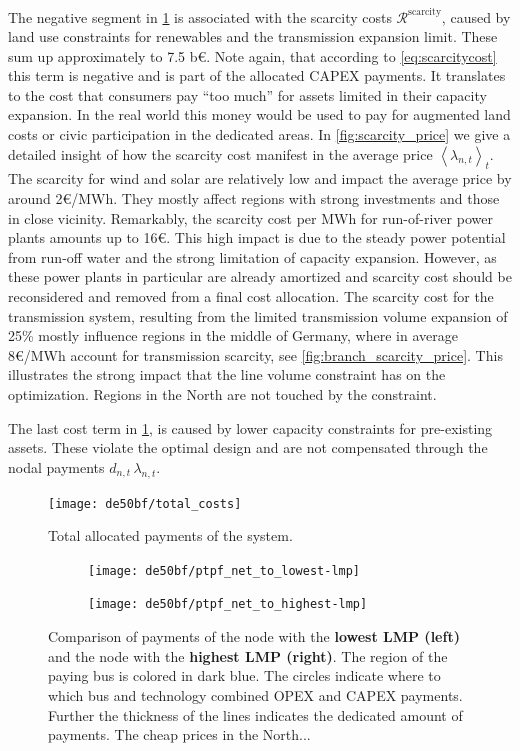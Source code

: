 \documentclass[11pt,twocolumn]{article}
\newcommand{\lmp}[1][n]{\lambda_{#1,t}}
\newcommand{\demand}[1][n]{d_{#1,t}}
\newcommand{\remainingcost}{\mathcal{R}}
\newcommand{\scarcitycost}{\remainingcost^\text{scarcity}}
\begin{document}
The negative segment in \cref{fig:total_cost} is associated with the scarcity costs $\scarcitycost$, caused by land use constraints for renewables and the transmission expansion limit. These sum up approximately to 7.5 b\euro. Note again, that according to \cref{eq:scarcitycost} this term is negative and is part of the allocated CAPEX payments. It translates to the cost that consumers pay ``too much'' for assets limited in their capacity expansion. In the real world this money would be used to pay for augmented land costs or civic participation in the dedicated areas. In \cref{fig:scarcity_price} we give a detailed insight of how the scarcity cost manifest in the average price $\left<\lmp\right>_t$. The scarcity for wind and solar are relatively low and impact the average price by around 2\euro/MWh. They mostly affect regions with strong investments and those in close vicinity. Remarkably, the scarcity cost per MWh for run-of-river power plants amounts up to 16\euro. This high impact is due to the steady power potential from run-off water and the strong limitation of capacity expansion. However, as these power plants in particular are already amortized and scarcity cost should be reconsidered and removed from a final cost allocation.    
The scarcity cost for the transmission system, resulting from the limited transmission volume expansion of 25\% mostly influence regions in the middle of Germany, where in average 8\euro/MWh account for transmission scarcity, see \cref{fig:branch_scarcity_price}. This illustrates the strong impact that the line volume constraint has on the optimization. Regions in the North are not touched by the constraint. 

The last cost term in \cref{fig:total_cost}, is  caused by lower capacity constraints for pre-existing assets. These violate the optimal design and are not compensated through the nodal payments $\demand \, \lmp$. 

\begin{figure}
    \centering
    \texttt{[image: de50bf/total\_costs]}
    \caption{Total allocated payments of the system. }
    \label{fig:total_cost}
\end{figure}




\begin{figure}
    \centering
    \begin{subfigure}[c]{.6\linewidth}
    \texttt{[image: de50bf/ptpf\_net\_to\_lowest-lmp]}
    \end{subfigure}
    \hspace{-.2151\linewidth}
    \begin{subfigure}[c]{.6\linewidth}
    \texttt{[image: de50bf/ptpf\_net\_to\_highest-lmp]}
    \end{subfigure}
    \caption{Comparison of payments of the node with the \textbf{lowest LMP (left)} and the node with the \textbf{highest LMP (right)}. The region of the paying bus is colored in dark blue. The circles indicate where to which bus and technology combined OPEX and CAPEX payments. Further the thickness of the lines indicates the dedicated amount of payments. The cheap prices in the North...  }
    \label{fig:direct-allocation}
\end{figure}
 
\end{document}
